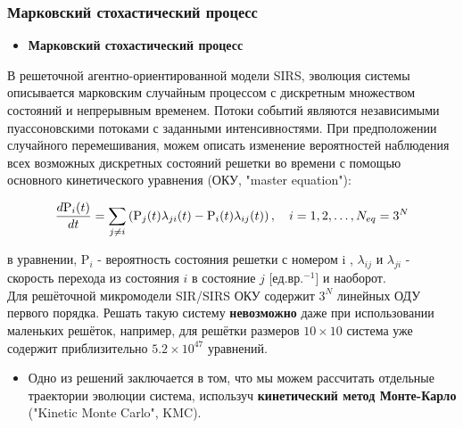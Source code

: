 \documentclass[
    11pt, %
    aspectratio=169, %
]{beamer}
\begin{document}
\begin{frame}
    \frametitle{Марковский стохастический процесс}
		
    \fontsize{8}{10}\selectfont{}

    \vspace{-0.2cm}
    \begin{itemize}
        \item \textbf{Марковский стохастический процесс}
    \end{itemize}

    В решеточной агентно-ориентированной модели SIRS, эволюция системы описывается марковским случайным процессом с дискретным множеством состояний и непрерывным временем. Потоки событий являются независимыми пуассоновскими потоками с заданными интенсивностями. При предположении случайного перемешивания, можем описать изменение вероятностей наблюдения всех возможных дискретных состояний решетки во времени с помощью основного кинетического уравнения (ОКУ, "master equation"):

    \vspace{-0.2cm}

    $$
    \frac{d \mathrm{P}_{i}(t)}{d t}=\sum_{j \neq i}\left(\mathrm{P}_{j}(t) \lambda_{j i}(t)-\mathrm{P}_{i}(t) \lambda_{i j}(t)\right), \quad i=1,2, \ldots, N_{e q}=3^{N} \\
    $$

    \vspace{-0.8cm}

    в уравнении, $\mathrm{P}_{i}$ - вероятность состояния решетки с номером  i , $\lambda_{i j}$ и $\lambda_{j i}$ - скорость перехода из состояния $i$ в состояние $j$  [$ед. вр.^{-1}$] и наоборот.\\
    Для решёточной микромодели SIR/SIRS ОКУ содержит $3^N$ линейных ОДУ первого порядка. Решать такую систему \textbf{невозможно} даже при использовании маленьких решёток, например, для решётки размеров $10 \times 10$ система уже содержит приблизительно $5.2 \times 10^{47}$ уравнений.

    \begin{itemize}
        \item  Одно из решений заключается в том, что мы можем рассчитать отдельные траектории эволюции система, используч \textbf{кинетический метод Монте-Карло} ("Kinetic Monte Carlo", KMC).
    \end{itemize}
   

\end{frame}
\end{document}
